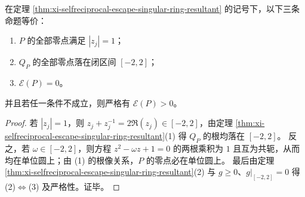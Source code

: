 \begin{corollary}[单位圆根判据的奇异环迹化]\label{cor:xi-unit-circle-criterion-singular-ring-resultant}
在定理 \ref{thm:xi-selfreciprocal-escape-singular-ring-resultant} 的记号下，以下三条命题等价：
\begin{enumerate}
  \item \(P\) 的全部零点满足 \(|z_j|=1\)；
  \item \(Q_P\) 的全部零点落在闭区间 \([-2,2]\)；
  \item \(\mathcal{E}(P)=0\)。
\end{enumerate}
并且若任一条件不成立，则严格有 \(\mathcal{E}(P)>0\)。
\end{corollary}
\begin{proof}
若 \(|z_j|=1\)，则 \(z_j+z_j^{-1}=2\Re(z_j)\in[-2,2]\)，由定理 \ref{thm:xi-selfreciprocal-escape-singular-ring-resultant}(1) 得 \(Q_P\) 的根均落在 \([-2,2]\)。
反之，若 \(\omega\in[-2,2]\)，则方程 \(z^2-\omega z+1=0\) 的两根乘积为 \(1\) 且互为共轭，从而均在单位圆上；由 (1) 的根像关系，\(P\) 的零点必在单位圆上。
最后由定理 \ref{thm:xi-selfreciprocal-escape-singular-ring-resultant}(2) 与 \(g\ge 0\)、\(g|_{[-2,2]}=0\) 得 (2)\(\Leftrightarrow\)(3) 及严格性。证毕。
\end{proof}

